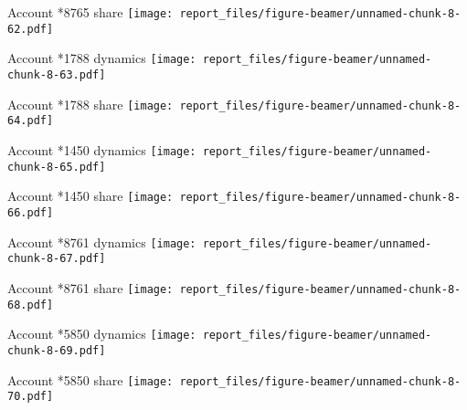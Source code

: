 \documentclass[ignorenonframetext,]{beamer}
\begin{document}
\begin{frame}{Account *8765 share
\texttt{[image: report\_files/figure-beamer/unnamed-chunk-8-62.pdf]}}
\protect\hypertarget{account-8765-share}{}

\end{frame}

\begin{frame}{Account *1788 dynamics
\texttt{[image: report\_files/figure-beamer/unnamed-chunk-8-63.pdf]}}
\protect\hypertarget{account-1788-dynamics}{}

\end{frame}

\begin{frame}{Account *1788 share
\texttt{[image: report\_files/figure-beamer/unnamed-chunk-8-64.pdf]}}
\protect\hypertarget{account-1788-share}{}

\end{frame}

\begin{frame}{Account *1450 dynamics
\texttt{[image: report\_files/figure-beamer/unnamed-chunk-8-65.pdf]}}
\protect\hypertarget{account-1450-dynamics}{}

\end{frame}

\begin{frame}{Account *1450 share
\texttt{[image: report\_files/figure-beamer/unnamed-chunk-8-66.pdf]}}
\protect\hypertarget{account-1450-share}{}

\end{frame}

\begin{frame}{Account *8761 dynamics
\texttt{[image: report\_files/figure-beamer/unnamed-chunk-8-67.pdf]}}
\protect\hypertarget{account-8761-dynamics}{}

\end{frame}

\begin{frame}{Account *8761 share
\texttt{[image: report\_files/figure-beamer/unnamed-chunk-8-68.pdf]}}
\protect\hypertarget{account-8761-share}{}

\end{frame}

\begin{frame}{Account *5850 dynamics
\texttt{[image: report\_files/figure-beamer/unnamed-chunk-8-69.pdf]}}
\protect\hypertarget{account-5850-dynamics}{}

\end{frame}

\begin{frame}{Account *5850 share
\texttt{[image: report\_files/figure-beamer/unnamed-chunk-8-70.pdf]}}
\protect\hypertarget{account-5850-share}{}

\end{frame}
\end{document}
